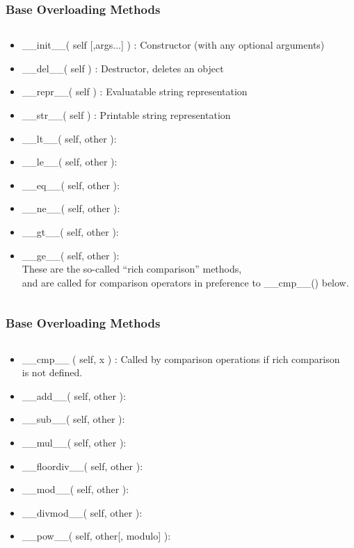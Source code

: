 \documentclass{beamer}
\begin{document}
\begin{frame}
	\frametitle{Base Overloading Methods}
	\begin{columns}[c]
		\begin{column}{30cm}
			\vspace{.1cm}
			\begin{itemize}
				\justifying
				\item \_\_init\_\_( self [,args...] ) : \textcolor{Ocean}{Constructor (with any optional arguments)}
				\item \_\_del\_\_( self ) : \textcolor{Ocean}{Destructor, deletes an object}
				\item \_\_repr\_\_( self ) : \textcolor{Ocean}{Evaluatable string representation}
				\item \_\_str\_\_( self ) : \textcolor{Ocean}{Printable string representation}
				\item \_\_lt\_\_( self, other ):
				\item \_\_le\_\_( self, other ):
				\item \_\_eq\_\_( self, other ):
				\item \_\_ne\_\_( self, other ):
				\item \_\_gt\_\_( self, other ):
				\item \_\_ge\_\_( self, other ): \\
				\textcolor{Ocean}{These are the so-called “rich comparison” methods,} \\
				\textcolor{Ocean}{and are called for comparison operators in preference to \_\_cmp\_\_() below.}
			\end{itemize}
		\end{column}
	\end{columns}
\end{frame}

\begin{frame}
	\frametitle{Base Overloading Methods}
	\begin{columns}[c]
		\begin{column}{30cm}
			\vspace{.1cm}
			\begin{itemize}
				\justifying
				\item \_\_cmp\_\_ ( self, x ) : \textcolor{Ocean}{Called by comparison operations if rich comparison} \\
				\textcolor{Ocean}{is not defined.} 
				\item \_\_add\_\_( self, other ):
				\item \_\_sub\_\_( self, other ):
				\item \_\_mul\_\_( self, other ):
				\item \_\_floordiv\_\_( self, other ):
				\item \_\_mod\_\_( self, other ):
				\item \_\_divmod\_\_( self, other ):
				\item \_\_pow\_\_( self, other[, modulo] ):
				\end{itemize}
		\end{column}
	\end{columns}
\end{frame}
\end{document}
